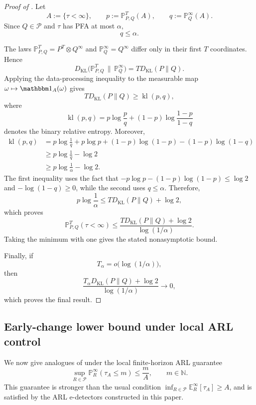 \documentclass[12pt]{article}
\theoremstyle{spaced}
\theoremstyle{remark}
\begin{document}
\begin{proof}[Proof of ]
Let
\[
A:=\{\tau<\infty\},
\qquad
p:=\mathbb P_{P,Q}^{T}(A),
\qquad
q:=\mathbb P_Q^\infty(A).
\]
Since $Q\in\mathcal P$ and $\tau$ has PFA at most $\alpha$,
\[
q\leq\alpha.
\]

The laws $\mathbb P_{P,Q}^{T}=P^T\otimes Q^\infty$ and
$\mathbb P_Q^\infty=Q^\infty$ differ only in their first $T$
coordinates. Hence
\[
D_{\mathrm{KL}}
\bigl(
\mathbb P_{P,Q}^{T}\,\|\,\mathbb P_Q^\infty
\bigr)
=
T D_{\mathrm{KL}}(P\|Q).
\]
Applying the data-processing inequality to the measurable map
$\omega\mapsto\mathbbm 1_A(\omega)$ gives
\[
T D_{\mathrm{KL}}(P\|Q)
\geq
\operatorname{kl}(p,q),
\]
where
\[
\operatorname{kl}(p,q)
=
p\log\frac pq
+
(1-p)\log\frac{1-p}{1-q}
\]
denotes the binary relative entropy.
Moreover,
\begin{align*}
\operatorname{kl}(p,q)
&=
p\log\frac1q
+
p\log p
+
(1-p)\log(1-p)
-
(1-p)\log(1-q)\\
&\geq
p\log\frac1q-\log 2\\
&\geq
p\log\frac1\alpha-\log 2.
\end{align*}
The first inequality uses
 the fact that $-p\log p-(1-p)\log(1-p)\leq\log 2$
and $-\log(1-q)\geq0$, while the second uses $q\leq\alpha$.
Therefore,
\[
p\log\frac1\alpha
\leq
T D_{\mathrm{KL}}(P\|Q)+\log 2,
\]
which proves
\[
\mathbb P_{P,Q}^{T}(\tau<\infty)
\leq
\frac{
T D_{\mathrm{KL}}(P\|Q)+\log 2
}{
\log(1/\alpha)
}.
\]
Taking the minimum with one gives the stated nonasymptotic bound.

Finally, if
\[
T_\alpha 
=
o\bigl(\log(1/\alpha)\bigr),
\]
then
\[
\frac{
T_\alpha D_{\mathrm{KL}}(P\|Q)+\log 2
}{
\log(1/\alpha)
}
\longrightarrow0,
\]
which proves the final result.
\end{proof}


\subsection{Early-change lower bound under local ARL control}\label{app:proof-arl-early}


We now give analogues of 
under the local finite-horizon ARL guarantee
\begin{equation}
\label{eq:local-arl-guarantee}
    \sup_{R\in\mathcal P}
    \mathbb P_R^\infty(\tau_A\le m)
    \le
    \frac{m}{A},
    \qquad m\in\mathbb N.
\end{equation}
This guarantee is stronger than the usual condition
\(\inf_{R\in\mathcal P}\mathbb E_R^\infty[\tau_A]\ge A\), and is
satisfied by the ARL e-detectors constructed in this paper.
\end{document}
